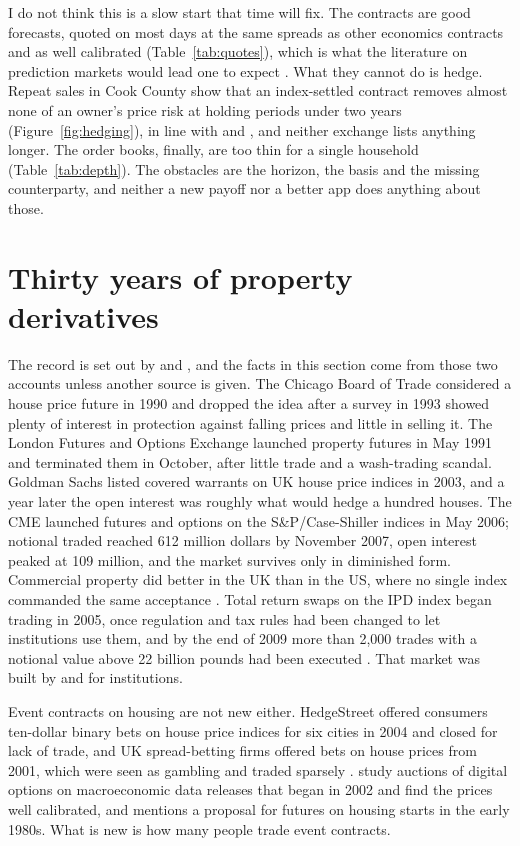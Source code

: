 \documentclass[12pt,a4paper]{article}
\begin{document}
I do not think this is a slow start that time will fix. The contracts are good forecasts, quoted on most days at the same spreads as other economics contracts and as well calibrated (Table~\ref{tab:quotes}), which is what the literature on prediction markets would lead one to expect \citep{wolfers2004prediction}. What they cannot do is hedge. Repeat sales in Cook County show that an index-settled contract removes almost none of an owner's price risk at holding periods under two years (Figure~\ref{fig:hedging}), in line with \citet{giacoletti2021idiosyncratic} and \citet{eichholtz2021total}, and neither exchange lists anything longer. The order books, finally, are too thin for a single household (Table~\ref{tab:depth}). The obstacles are the horizon, the basis and the missing counterparty, and neither a new payoff nor a better app does anything about those.

\section{Thirty years of property derivatives}

The record is set out by \citet{shiller2008derivatives} and \citet{fabozzi2020thirty}, and the facts in this section come from those two accounts unless another source is given. The Chicago Board of Trade considered a house price future in 1990 and dropped the idea after a survey in 1993 showed plenty of interest in protection against falling prices and little in selling it. The London Futures and Options Exchange launched property futures in May 1991 and terminated them in October, after little trade and a wash-trading scandal. Goldman Sachs listed covered warrants on UK house price indices in 2003, and a year later the open interest was roughly what would hedge a hundred houses. The CME launched futures and options on the S\&P/Case-Shiller indices in May 2006; notional traded reached 612 million dollars by November 2007, open interest peaked at 109 million, and the market survives only in diminished form. Commercial property did better in the UK than in the US, where no single index commanded the same acceptance \citep{geltner2007pricing}. Total return swaps on the IPD index began trading in 2005, once regulation and tax rules had been changed to let institutions use them, and by the end of 2009 more than 2,000 trades with a notional value above 22 billion pounds had been executed \citep{lizieri2012pricing}. That market was built by and for institutions.

Event contracts on housing are not new either. HedgeStreet offered consumers ten-dollar binary bets on house price indices for six cities in 2004 and closed for lack of trade, and UK spread-betting firms offered bets on house prices from 2001, which were seen as gambling and traded sparsely \citep{shiller2008derivatives,fabozzi2020thirty}. \citet{gurkaynak2006macroeconomic} study auctions of digital options on macroeconomic data releases that began in 2002 and find the prices well calibrated, and \citet{carlton1984futures} mentions a proposal for futures on housing starts in the early 1980s. What is new is how many people trade event contracts.
\end{document}
